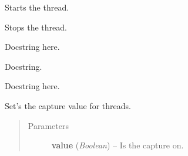 \documentclass[letterpaper,10pt,english]{sphinxmanual}
\begin{document}
\begin{fulllineitems}

\begin{fulllineitems}
\label{threads:threads.inputcapture.INPUT_CAPTURE.run}
Starts the thread.

\end{fulllineitems}


\begin{fulllineitems}
\label{threads:threads.inputcapture.INPUT_CAPTURE.stop}
Stops the thread.

\end{fulllineitems}


\begin{fulllineitems}
\label{threads:threads.inputcapture.INPUT_CAPTURE.unhook}
Docstring here.

\end{fulllineitems}


\end{fulllineitems}


\begin{fulllineitems}
\label{threads:threads.inputcapture.MOUSE_CAPTURE}
Docstring.

\begin{fulllineitems}
\label{threads:threads.inputcapture.MOUSE_CAPTURE.parse_mouse_events}
Docstring here.

\end{fulllineitems}


\end{fulllineitems}


\begin{fulllineitems}
\label{threads:threads.inputcapture.set_capture}
Set's the capture value for threads.
\begin{quote}\begin{description}
\item[{Parameters}] \leavevmode
\textbf{value} (\emph{Boolean}) -- Is the capture on.

\end{description}\end{quote}

\end{fulllineitems}
\end{document}
